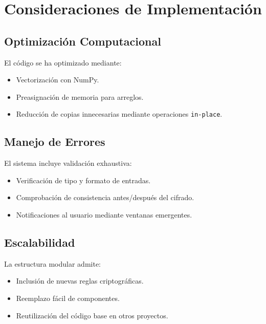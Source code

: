 \section{Consideraciones de Implementaci\'on}
\subsection{Optimizaci\'on Computacional}
El c\'odigo se ha optimizado mediante:
\begin{itemize}
\item Vectorizaci\'on con NumPy.
\item Preasignaci\'on de memoria para arreglos.
\item Reducci\'on de copias innecesarias mediante operaciones \texttt{in-place}.
\end{itemize}

\subsection{Manejo de Errores}
El sistema incluye validaci\'on exhaustiva:
\begin{itemize}
\item Verificaci\'on de tipo y formato de entradas.
\item Comprobaci\'on de consistencia antes/despu\'es del cifrado.
\item Notificaciones al usuario mediante ventanas emergentes.
\end{itemize}

\subsection{Escalabilidad}
La estructura modular admite:
\begin{itemize}
\item Inclusi\'on de nuevas reglas criptogr\'aficas.
\item Reemplazo f\'acil de componentes.
\item Reutilizaci\'on del c\'odigo base en otros proyectos.
\end{itemize}
